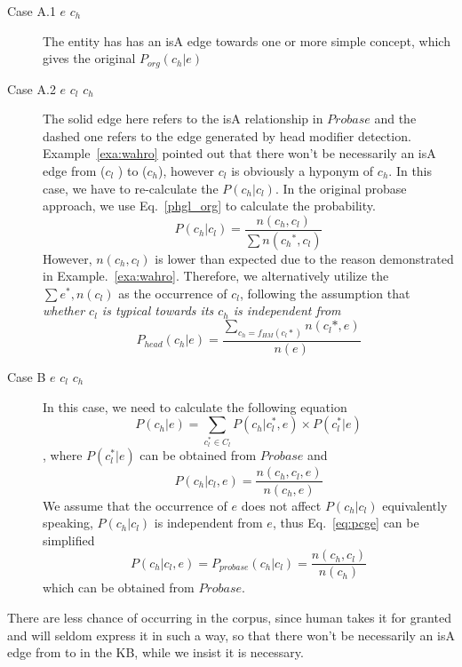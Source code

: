 \begin{description}

\item[Case A.1 $e$ \isa ${c_h}$ ]
 The entity has has an isA edge towards one or more simple concept, which gives the original $P_{org}({c_h}|e)$


\item[Case A.2 $e$ \isa $c_{l}$ \noisa ${c_h}$]  The solid edge here refers to the isA relationship in $Probase$ and the dashed one refers to the edge generated by head modifier detection. Example~\ref{exa:wahro} pointed out that there won't be necessarily an isA edge from ($c_{l}$ ) to (${c_h}$), however $c_{l}$ is obviously a hyponym of ${c_h}$. In this case,
    we have to re-calculate the $P({c_h}|{c_l})$.
    In the original probase approach, we use Eq.~\ref{phgl_org} to calculate the probability.
    \begin{equation}\label{phgl_org} P({c_h}|{c_l}) = \frac{n( {c_h},{c_l} )}{ \sum{n( {c_h}^*,{c_l} )}  } \end{equation}
    However, $n( {c_h},{c_l} )$ is lower than expected due to the reason demonstrated in Example.~\ref{exa:wahro}.
    Therefore, we alternatively utilize the $\sum{ e^*,n({c_l}) } $ as the occurrence of $c_l$, following the assumption that \em{ whether $c_l$ is typical towards its $c_h$ is independent from }
    $$P_{head}(c_h|e)=\frac{\sum_{c_h= f_{HM}(c_l*)} n(c_l*,e)}{ n(e)} $$

\item[Case B $e$ \isa $c_{l}$  \isa ${c_h}$]  In this case, we need to calculate the following equation
$$P({c_h}|e) = \sum_{c_{l}^*\in C_{l}}   P({c_h}|c_{l}^*,e)   \times    P(c_{l}^*|e) $$
, where $P(c_{l}^*|e)$ can be obtained from $Probase$ and
\begin{equation}P({c_h}|c_{l},e) = \frac{n({c_h},c_{l}, e)}{n({c_h}, e)}\label{eq:pcge}\end{equation}
We assume that the occurrence of $e$ does not affect $P({c_h}|c_{l})$ equivalently speaking, $P({c_h}|c_{l})$ is independent from $e$, thus Eq.~\ref{eq:pcge} can be simplified
$$P({c_h}|c_{l},e) =P_{probase}({c_h}|c_{l}) = \frac{n({c_h},c_{l})}{n({c_h})}$$
which can be obtained from $Probase$.



\end{description}

\begin{example}\label{exa:wahro}
There are less chance of occurring  in the corpus, since human takes it for granted and will seldom express it in such a way, so that there won't be necessarily an isA edge from  to  in the KB, while we insist it is necessary.
\end{example}

